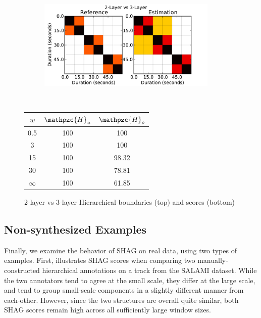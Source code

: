 \documentclass{article}
\def\shag{\ensuremath{\mathpzc{H}}}
\begin{document}
\begin{figure}[t]
  \centering
  \begin{subfigure}{0.5\textwidth}
    \centering
    \includegraphics[width=0.94\textwidth]{plots/hier-hiercomp.pdf}
  \end{subfigure}%
  \\
  \begin{minipage}{0.5\textwidth}
    \centering
    \vspace{10pt}
    \begin{tabular}{|c|c|c|}
      \hline
      $w$       & $\shag_u$       & $\shag_o$      \\
      \hline
      0.5       & 100       & 100      \\     
      3         & 100       & 100      \\
      15        & 100       & 98.32    \\
      30        & 100       & 78.81    \\
      $\infty$  & 100       & 61.85    \\
      \hline
    \end{tabular}
  \end{minipage}
  \caption{2-layer vs 3-layer Hierarchical boundaries (top) and scores (bottom)}
  \label{fig:hier-hiercomp}
\end{figure}


\subsection{Non-synthesized Examples}
Finally, we examine the behavior of SHAG on real data, using two types of examples.
First,  illustrates SHAG scores when comparing two manually-constructed hierarchical annotations on a track from the SALAMI dataset.
While the two annotators tend to agree at the small scale, they differ at the large scale, and tend to group small-scale components in a slightly different manner from each-other.
However, since the two structures are overall quite similar, both SHAG scores remain high across all sufficiently large window sizes.
\end{document}
